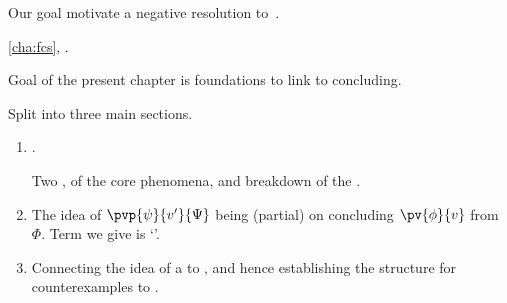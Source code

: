 \begin{note}
  Our goal motivate a negative resolution to~\issueConstraint{}.

  \autoref{cha:fcs}, .

  Goal of the present chapter is foundations to link  to concluding.

  Split into three main sections.
  \begin{enumerate}[label=]
  \item
    .

    Two ,  of the core phenomena, and breakdown of the .
  \item

    The idea of \(\pvp{\psi}{v'}{\Psi}\) being (partial) \check{} on concluding \(\pv{\phi}{v}\) from \(\Phi\).
    Term we give is `\curb{}'.
  \item

    Connecting the idea of a \curb{} to \ros{}, and hence establishing the structure for counterexamples to \issueConstraint{}.
  \end{enumerate} 
\end{note}


